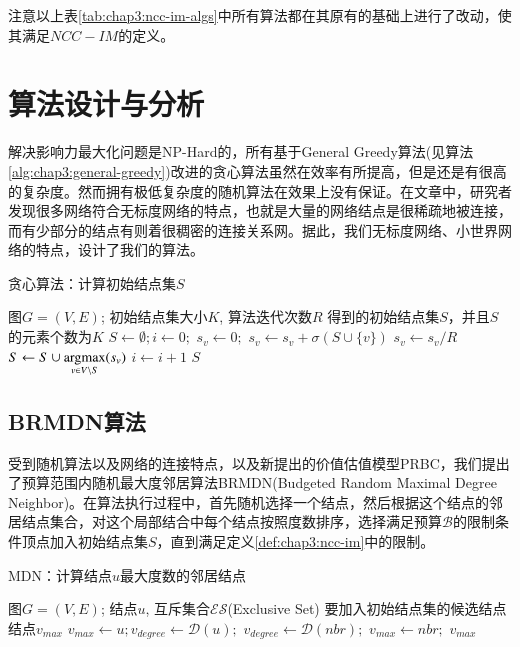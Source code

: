 注意以上表\ref{tab:chap3:ncc-im-algs}中所有算法都在其原有的基础上进行了改动，使其满足$NCC-IM$的定义。


\section{算法设计与分析}
解决影响力最大化问题是NP-Hard的，所有基于General Greedy算法(见算法\ref{alg:chap3:general-greedy})改进的贪心算法虽然在效率有所提高，但是还是有很高的复杂度。然而拥有极低复杂度的随机算法在效果上没有保证。在文章\cite{barabasi1999emergence}\cite{adamic2000power}\cite{watts1998collective}中，研究者发现很多网络符合无标度网络的特点，也就是大量的网络结点是很稀疏地被连接，而有少部分的结点有则着很稠密的连接关系网。据此，我们无标度网络、小世界网络的特点，设计了我们的算法。

\begin{algorithm}
\caption{贪心算法：计算初始结点集$S$}
\label{alg:chap3:general-greedy}
\begin{algorithmic}
\REQUIRE 图$G=(V,E)$; 初始结点集大小$K$, 算法迭代次数$R$
\ENSURE 得到的初始结点集$S$，并且$S$的元素个数为$K$
\STATE $S \leftarrow \emptyset; i \leftarrow 0;$
		\STATE $s_{v} \leftarrow 0;$
			\STATE $s_{v} \leftarrow s_{v} + \sigma(S \cup \{v\})$
		\ENDFOR
		\STATE $s_{v} \leftarrow s_{v}/R$
	\ENDFOR
	\STATE $S \leftarrow S \cup \mathop{\rm argmax} \limits_{v \in V \setminus S}(s_{v})$
	\STATE $i \leftarrow i + 1$
\ENDWHILE
\RETURN $S$
\end{algorithmic}
\end{algorithm}


\subsection{BRMDN算法}
受到随机算法以及网络的连接特点，以及新提出的价值估值模型PRBC，我们提出了预算范围内随机最大度邻居算法BRMDN(Budgeted Random Maximal Degree Neighbor)。在算法执行过程中，首先随机选择一个结点，然后根据这个结点的邻居结点集合，对这个局部结合中每个结点按照度数排序，选择满足预算$\mathcal{B}$的限制条件顶点加入初始结点集$S$，直到满足定义\ref{def:chap3:ncc-im}中的限制。


\begin{algorithm}
\caption{MDN：计算结点$u$最大度数的邻居结点}
\label{alg:chap3:mdn-alg}
\begin{algorithmic}
\REQUIRE 图$G=(V,E)$; 结点$u$, 互斥集合$\mathcal{ES}$(Exclusive Set)
\ENSURE 要加入初始结点集的候选结点结点$v_{max}$
\STATE $v_{max} \leftarrow u; v_{degree} \leftarrow \mathcal{D}(u);$
		\STATE $v_{degree} \leftarrow \mathcal{D}(nbr);$
		\STATE $v_{max} \leftarrow nbr;$
	\ENDIF
\ENDFOR
\RETURN $v_{max}$
\end{algorithmic}
\end{algorithm}


